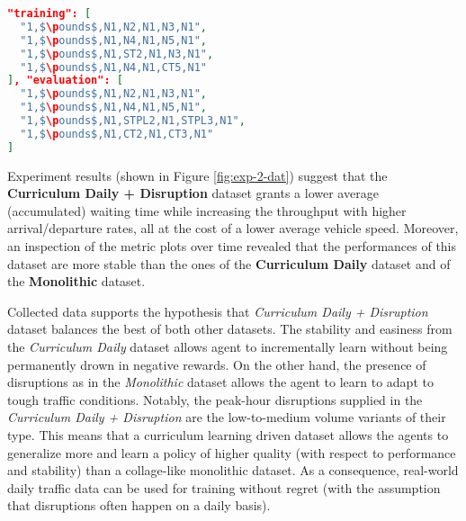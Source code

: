 \noindent
\begin{minipage}{\linewidth}
\begin{lstlisting}[language=JSON, caption=The schema for the "Curriculum Daily + Disruption" Dataset, label={lst:dataset-schema-curriculum-daily-plus-disruption}, mathescape=true]
"training": [
  "1,$\pounds$,N1,N2,N1,N3,N1",
  "1,$\pounds$,N1,N4,N1,N5,N1",
  "1,$\pounds$,N1,ST2,N1,N3,N1",
  "1,$\pounds$,N1,N4,N1,CT5,N1"
], "evaluation": [
  "1,$\pounds$,N1,N2,N1,N3,N1",
  "1,$\pounds$,N1,N4,N1,N5,N1",
  "1,$\pounds$,N1,STPL2,N1,STPL3,N1",
  "1,$\pounds$,N1,CT2,N1,CT3,N1"
]
\end{lstlisting}
\end{minipage}

Experiment results (shown in Figure \ref{fig:exp-2-dat}) suggest that the \textbf{Curriculum Daily + Disruption} dataset grants a lower average (accumulated) waiting time while increasing the throughput with higher arrival/departure rates, all at the cost of a lower average vehicle speed. Moreover, an inspection of the metric plots over time revealed that the performances of this dataset are more stable than the ones of the \textbf{Curriculum Daily} dataset and of the \textbf{Monolithic} dataset.

Collected data supports the hypothesis that \textit{Curriculum Daily + Disruption} dataset balances the best of both other datasets.
The stability and easiness from the \textit{Curriculum Daily} dataset allows agent to incrementally learn without being permanently drown in negative rewards.
On the other hand, the presence of disruptions as in the \textit{Monolithic} dataset allows the agent to learn to adapt to tough traffic conditions.
Notably, the peak-hour disruptions supplied in the \textit{Curriculum Daily + Disruption} are the low-to-medium volume variants of their type.
This means that a curriculum learning driven dataset allows the agents to generalize more and learn a policy of higher quality (with respect to performance and stability) than a collage-like monolithic dataset.
As a consequence, real-world daily traffic data can be used for training without regret (with the assumption that disruptions often happen on a daily basis).



